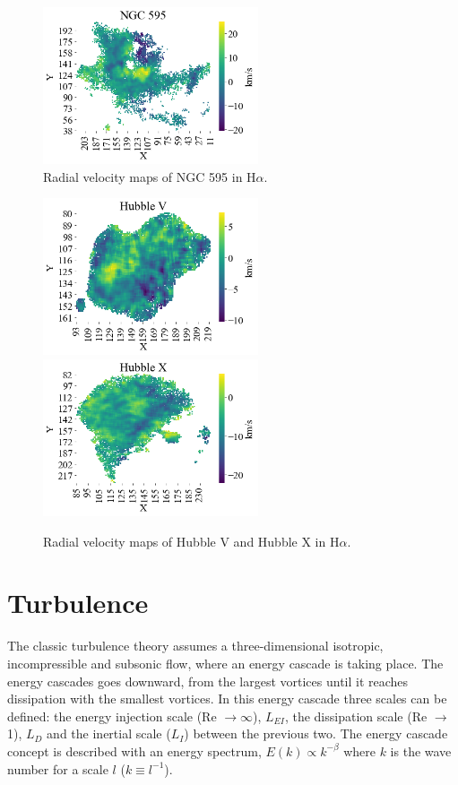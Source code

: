 \documentclass[fleqn,usenatbib]{mnras}
\begin{document}
\begin{figure}
\centering 
\includegraphics[width=2.5in]{Figures/5TAU.png}
\caption{Radial velocity maps of NGC 595 in H$\alpha$.}
\label{fig:M595}
\end{figure}

\begin{figure}
\centering 
\includegraphics[width=2.5in]{Figures/MV.png}
\includegraphics[width=2.5in]{Figures/MX.png}
\caption{Radial velocity maps of Hubble V and Hubble X in H$\alpha$.}
\label{fig:MHub}
\end{figure}


\section{Turbulence}\label{sec:turb}

The classic turbulence theory \citep{kolm1} assumes a three-dimensional isotropic, incompressible and subsonic flow, where an energy cascade is taking place. The energy cascades goes downward, from the largest vortices until it reaches dissipation with the smallest vortices. 
In this energy cascade three scales can be defined: the energy injection scale (Re $\rightarrow \infty$), $L_{EI}$, the dissipation scale (Re $\rightarrow$ 1), $L_{D}$ and the inertial scale ($L_{I}$) between the previous two. The energy cascade concept is described with an energy spectrum, $E(k) \propto k^{-\beta}$ where $k$ is the wave number for a scale $l$ ($k \equiv l^{-1}$).
\end{document}
